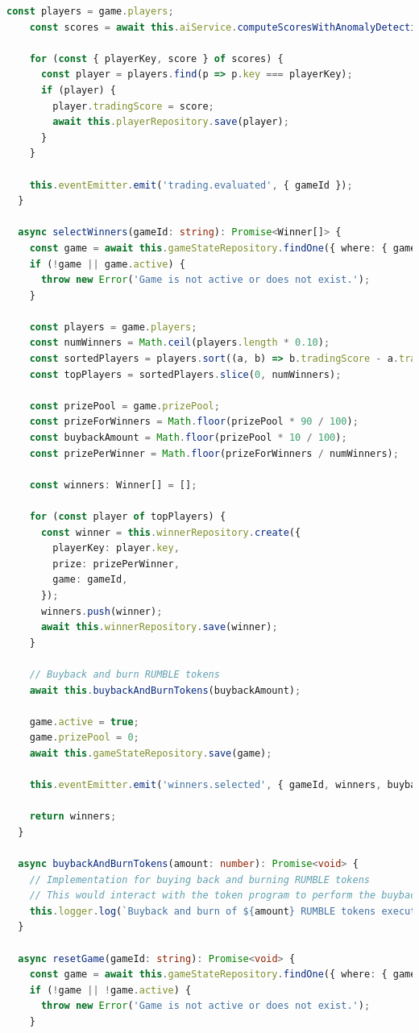 \documentclass[11pt,a4paper]{article}
\begin{document}
\begin{lstlisting}[language=TypeScript, caption={Game Service}]
    const players = game.players;
    const scores = await this.aiService.computeScoresWithAnomalyDetection(players.map(p => p.key));

    for (const { playerKey, score } of scores) {
      const player = players.find(p => p.key === playerKey);
      if (player) {
        player.tradingScore = score;
        await this.playerRepository.save(player);
      }
    }

    this.eventEmitter.emit('trading.evaluated', { gameId });
  }

  async selectWinners(gameId: string): Promise<Winner[]> {
    const game = await this.gameStateRepository.findOne({ where: { gameId }, relations: ['players'] });
    if (!game || game.active) {
      throw new Error('Game is not active or does not exist.');
    }

    const players = game.players;
    const numWinners = Math.ceil(players.length * 0.10);
    const sortedPlayers = players.sort((a, b) => b.tradingScore - a.tradingScore);
    const topPlayers = sortedPlayers.slice(0, numWinners);

    const prizePool = game.prizePool;
    const prizeForWinners = Math.floor(prizePool * 90 / 100);
    const buybackAmount = Math.floor(prizePool * 10 / 100);
    const prizePerWinner = Math.floor(prizeForWinners / numWinners);

    const winners: Winner[] = [];

    for (const player of topPlayers) {
      const winner = this.winnerRepository.create({
        playerKey: player.key,
        prize: prizePerWinner,
        game: gameId,
      });
      winners.push(winner);
      await this.winnerRepository.save(winner);
    }

    // Buyback and burn RUMBLE tokens
    await this.buybackAndBurnTokens(buybackAmount);

    game.active = true;
    game.prizePool = 0;
    await this.gameStateRepository.save(game);

    this.eventEmitter.emit('winners.selected', { gameId, winners, buybackAmount });

    return winners;
  }

  async buybackAndBurnTokens(amount: number): Promise<void> {
    // Implementation for buying back and burning RUMBLE tokens
    // This would interact with the token program to perform the buyback and burn
    this.logger.log(`Buyback and burn of ${amount} RUMBLE tokens executed.`);
  }

  async resetGame(gameId: string): Promise<void> {
    const game = await this.gameStateRepository.findOne({ where: { gameId }, relations: ['players', 'winners'] });
    if (!game || !game.active) {
      throw new Error('Game is not active or does not exist.');
    }


\end{lstlisting}
\end{document}
